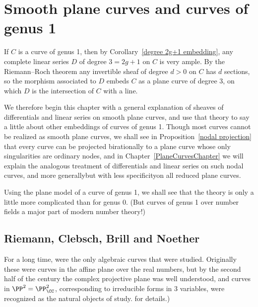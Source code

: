 

\chapter{Smooth plane curves and curves of genus 1}\label{3b}\label{genus 1 chapter}

If $C$ is a 
%
curve of genus 1, then by Corollary~\ref{degree 2g+1 embedding}, any complete linear series $D$ of
degree $3 = 2g+1$ on $C$ is very ample. By the Riemann--Roch theorem any invertible sheaf
of degree $d>0$ on $C$ has $d$ sections, so the morphism associated to $D$ embeds $C$
as a plane curve of degree 3, on which $D$ is the intersection of $C$ with a line. 

We therefore begin this chapter with a general explanation of 
%
sheaves of differentials and linear
series on smooth plane curves, and use that theory to say a little about other embeddings of 
curves of genus 1. Though most curves cannot be realized as smooth plane curves, we shall see
in Proposition~\ref{nodal projection} that every curve can be projected birationally to a plane curve whose only singularities are ordinary nodes, and in Chapter~\ref{PlaneCurvesChapter} we will
explain the analogous treatment of differentials and linear series on
such 
%
nodal curves, and more
generally\emdash but with less specificity\emdash on all reduced plane curves.

Using the plane model of a curve of genus 1, we shall see that the
theory is only a little more complicated than for genus 0. (But curves
of genus 1 over number fields 
a major part of modern number theory!)


\section{Riemann, Clebsch, Brill and Noether}
For a long time, 
%
were the only algebraic curves that were
studied. Originally these were curves in the affine plane over the
real numbers, but by the second half of the 
century the complex
projective plane was well understood, and curves in $\PP^2 =
\PP^2_\CC$, corresponding to irreducible forms in 3 variables, were
recognized as the natural objects of study. 
for details.)

